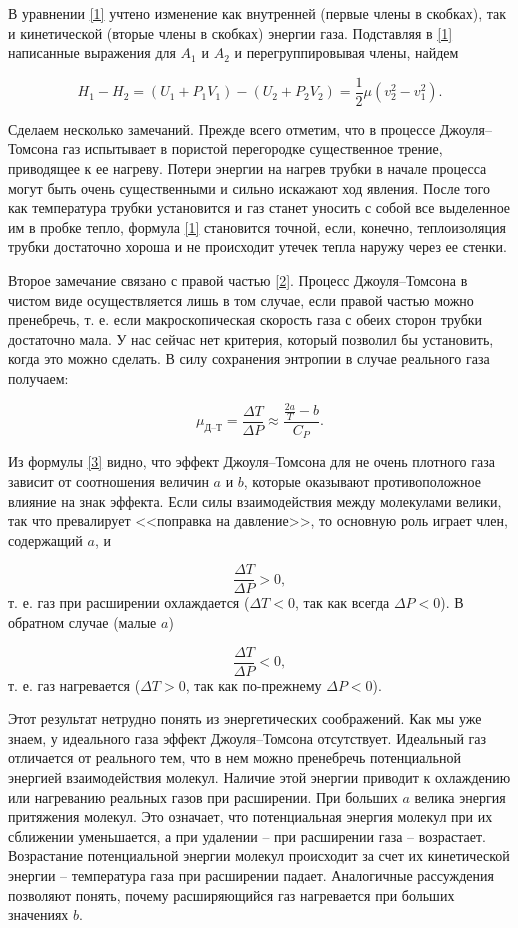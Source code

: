 \documentclass[12pt,a4paper]{article}
\begin{document}
В уравнении \eqref{1} учтено изменение как внутренней (первые члены в скобках), так и кинетической (вторые члены в скобках) энергии газа. Подставляя в \eqref{1} написанные выражения для $ A_1 $ и $ A_2 $ и перегруппировывая члены, найдем

\begin{equation}\label{2}
	H_1-H_2=\left(U_1+P_1V_1\right) - \left(U_2 + P_2V_2\right) = \frac{1}{2} \mu \left(v^2_2-v^2_1\right).
\end{equation}

Сделаем несколько замечаний. Прежде всего отметим, что в процессе Джоуля–Томсона газ испытывает в пористой перегородке существенное трение, приводящее к ее нагреву. Потери энергии на нагрев трубки в начале процесса могут быть очень существенными и сильно искажают ход явления. После того как температура трубки установится и газ станет уносить с собой все выделенное им в пробке тепло, формула \eqref{1} становится точной, если, конечно, теплоизоляция трубки достаточно хороша и не происходит утечек тепла наружу через ее стенки.

Второе замечание связано с правой частью \eqref{2}. Процесс Джоуля–Томсона в чистом виде осуществляется лишь в том случае, если правой частью можно пренебречь, т. е. если макроскопическая скорость газа с обеих сторон трубки достаточно мала. У нас сейчас нет критерия, который позволил бы установить, когда это можно сделать. В силу сохранения энтропии в случае реального газа получаем:

\begin{equation}\label{3}
	\mu_\text{Д--Т} = \frac{\Delta T}{\Delta P} \approx \frac{\frac{2a}{T} - b}{C_P}.
\end{equation}

Из формулы \eqref{3} видно, что эффект Джоуля–Томсона для не очень плотного газа зависит от соотношения величин $ a $ и $ b $, которые оказывают противоположное влияние на знак эффекта. Если силы взаимодействия между молекулами велики, так что превалирует <<поправка на давление>>, то основную роль играет член, содержащий $a$, и 

$$ \frac{\Delta T}{\Delta P} > 0, $$
т. е. газ при расширении охлаждается ($ \Delta T < 0 $, так как всегда $ \Delta P < 0 $). В обратном случае (малые $ a $)

$$ \frac{\Delta T}{\Delta P} < 0, $$
т. е. газ нагревается ($ \Delta T > 0 $, так как по-прежнему $ \Delta P < 0 $).

Этот результат нетрудно понять из энергетических соображений. Как мы уже знаем, у идеального газа эффект Джоуля–Томсона отсутствует. Идеальный газ отличается от реального тем, что в нем можно пренебречь потенциальной энергией взаимодействия молекул. Наличие этой энергии приводит к охлаждению или нагреванию реальных газов при расширении. При больших $a$ велика энергия притяжения молекул. Это означает, что потенциальная энергия молекул при их сближении уменьшается, а при удалении -- при расширении газа -- возрастает. Возрастание потенциальной энергии молекул происходит за счет их кинетической энергии -- температура газа при расширении падает. Аналогичные рассуждения позволяют понять, почему расширяющийся газ нагревается при больших значениях $b$.
\end{document}
